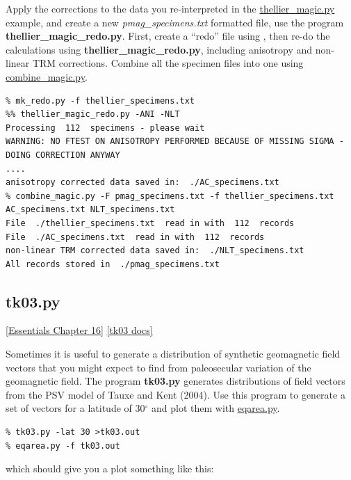 \documentclass[11pt]{book}
\begin{document}
{{Apply the corrections to the  data you re-interpreted in the \href{#thellier_magic.py}{thellier\_magic.py} example,   and create a new {\it pmag\_specimens.txt} formatted file, use the program {\bf thellier\_magic\_redo.py}.   First, create a ``redo'' file using \href{#mk_redo.py}, then re-do the calculations using {\bf thellier\_magic\_redo.py}, including anisotropy and non-linear TRM corrections.    Combine all the specimen files into one using \href{#combine_magic.py}{combine\_magic.py}.  

\begin{verbatim}
% mk_redo.py -f thellier_specimens.txt
%% thellier_magic_redo.py -ANI -NLT
Processing  112  specimens - please wait 
WARNING: NO FTEST ON ANISOTROPY PERFORMED BECAUSE OF MISSING SIGMA - DOING CORRECTION ANYWAY
....
anisotropy corrected data saved in:  ./AC_specimens.txt
% combine_magic.py -F pmag_specimens.txt -f thellier_specimens.txt AC_specimens.txt NLT_specimens.txt
File  ./thellier_specimens.txt  read in with  112  records
File  ./AC_specimens.txt  read in with  112  records
non-linear TRM corrected data saved in:  ./NLT_specimens.txt
All records stored in  ./pmag_specimens.txt
\end{verbatim}

\subsection{tk03.py}
\href{http://magician.ucsd.edu/Essentials_2/Webbook2ch16.html/#ch16}{[Essentials Chapter 16]}
\href{http://earthref.org/PmagPy/pmagpydocs/tk03-module.html}{[tk03 docs]}

Sometimes it is useful to generate a distribution of synthetic geomagnetic field vectors that you might expect to find from paleosecular variation of the geomagnetic field.  The program {\bf tk03.py} generates distributions of field vectors from the PSV model of Tauxe and Kent (2004).  \nocite{tauxe04}    Use this program to generate a set of vectors  for a latitude of 30$^{\circ}$ and plot them with \href{#eqarea.py}{eqarea.py}.  

\begin{verbatim}
% tk03.py -lat 30 >tk03.out
% eqarea.py -f tk03.out
\end{verbatim} 

which should give you a plot something like this:

}}
\end{document}
